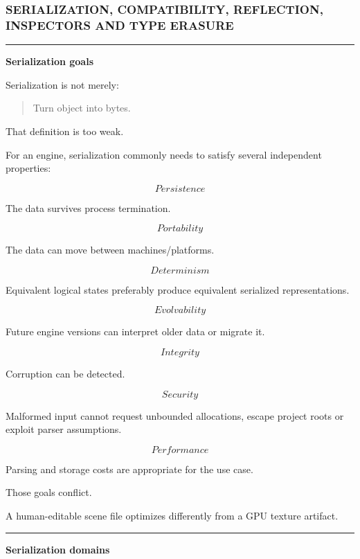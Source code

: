 \subsubsection{SERIALIZATION, COMPATIBILITY, REFLECTION, INSPECTORS AND TYPE ERASURE}\label{serialization-compatibility-reflection-inspectors-and-type-erasure}

\begin{center}\rule{0.5\linewidth}{0.5pt}\end{center}

\textbf{Serialization goals}

Serialization is not merely:

\begin{quote}
Turn object into bytes.
\end{quote}

That definition is too weak.

For an engine, serialization commonly needs to satisfy several independent properties:

\[
\boxed{
Persistence
}
\]

The data survives process termination.

\[
\boxed{
Portability
}
\]

The data can move between machines/platforms.

\[
\boxed{
Determinism
}
\]

Equivalent logical states preferably produce equivalent serialized representations.

\[
\boxed{
Evolvability
}
\]

Future engine versions can interpret older data or migrate it.

\[
\boxed{
Integrity
}
\]

Corruption can be detected.

\[
\boxed{
Security
}
\]

Malformed input cannot request unbounded allocations, escape project roots or exploit parser assumptions.

\[
\boxed{
Performance
}
\]

Parsing and storage costs are appropriate for the use case.

Those goals conflict.

A human-editable scene file optimizes differently from a GPU texture artifact.

\begin{center}\rule{0.5\linewidth}{0.5pt}\end{center}

\textbf{Serialization domains}

